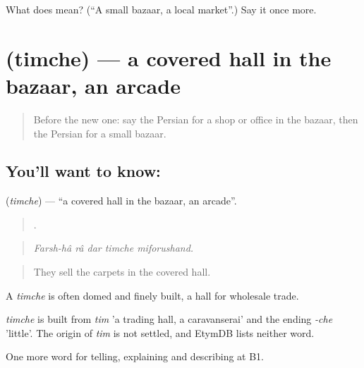 \begin{tcolorbox}[breakable,colback=teal!4,colframe=teal!35!black,title={Before you move on}]
What does  mean? (\textquotedblleft{}A small bazaar, a local market\textquotedblright{}.) Say it once more.
\end{tcolorbox}
\section[\texorpdfstring{\fa{تیمچه} (timche)}{تیمچه (timche)}]{ (timche) — a covered hall in the bazaar, an arcade}

\label{lesson:FA-C457-timche}



\begin{quote}
Before the new one: say the Persian for a shop or office in the bazaar, then the Persian for a small bazaar.
\end{quote}

\subsection*{You'll want to know: }
\textbf{} (\emph{timche}) — \textquotedblleft{}a covered hall in the bazaar, an arcade\textquotedblright{}.

\begin{quote}
    .
\end{quote}

\begin{quote}
\emph{Farsh-hâ râ dar timche miforushand.}
\end{quote}

\begin{quote}
They sell the carpets in the covered hall.
\end{quote}

A \emph{timche} is often domed and finely built, a hall for wholesale trade.

\begin{cousinweb}
\emph{timche} is built from \emph{tim} 'a trading hall, a caravanserai' and the ending \emph{-che} 'little'. The origin of \emph{tim} is not settled, and EtymDB lists neither word.
\end{cousinweb}

\begin{grammarlens}[title={What you've built}]
One more word for telling, explaining and describing at B1.
\end{grammarlens}


